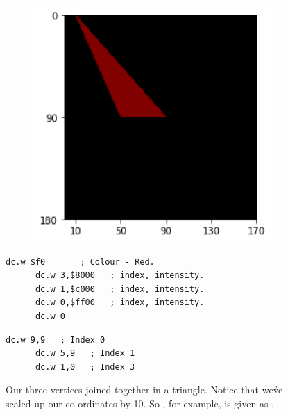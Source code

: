 \begin{figure}[H]
  \centering
  \begin{adjustbox}{width=13cm,center}
    \begin{minipage}[c]{0.48\linewidth}
      \begin{figure}[H]
        \centering
        \begin{adjustbox}{width=5.5cm,center}
          \includegraphics[width=12cm]{src/flipper/flipper_face_1.png}%
        \end{adjustbox}
      \end{figure}
    \end{minipage}
    \begin{minipage}[c]{0.48\linewidth}
      \begin{lstlisting}[basicstyle=\scriptsize\ttfamily]
      dc.w $f0       ; Colour - Red.
      dc.w 3,$8000   ; index, intensity.
      dc.w 1,$c000   ; index, intensity.
      dc.w 0,$ff00   ; index, intensity.
      dc.w 0
      \end{lstlisting}
      \begin{lstlisting}[basicstyle=\scriptsize\ttfamily]
      dc.w 9,9   ; Index 0
      dc.w 5,9   ; Index 1
      dc.w 1,0   ; Index 3
      \end{lstlisting}
      \vspace*{\fill}
    \end{minipage}
  \end{adjustbox}
  \caption{Our three vertices joined together in a triangle. Notice that we\'ve scaled up our co-ordinates by 10. So , for example, is given as .}
\end{figure}

